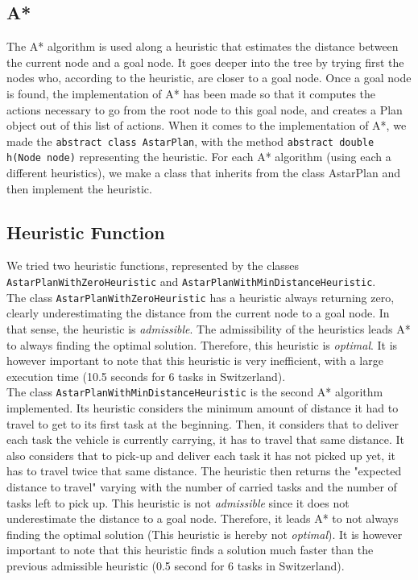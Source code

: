 \documentclass[11pt]{article}
\begin{document}
\subsection{A*}
The A* algorithm is used along a heuristic that estimates the distance between the current node and a goal node. It goes deeper into the tree by trying first the nodes who, according to the heuristic, are closer to a goal node. Once a goal node is found, the implementation of A* has been made so that it computes the actions necessary to go from the root node to this goal node, and creates a Plan object out of this list of actions. When it comes to the implementation of A*, we made the \texttt{abstract class AstarPlan}, with the method \texttt{abstract double h(Node node)} representing the heuristic. For each A* algorithm (using each a different heuristics), we make a class that inherits from\textsl{} the class AstarPlan and then implement the heuristic. 

\subsection{Heuristic Function}
We tried two heuristic functions, represented by the classes \texttt{AstarPlanWithZeroHeuristic} and \texttt{AstarPlanWithMinDistanceHeuristic}.\\

The class \texttt{AstarPlanWithZeroHeuristic} has a heuristic always returning zero, clearly underestimating the distance from the current node to a goal node. In that sense, the heuristic is \textit{admissible}. The admissibility of the heuristics leads A* to always finding the optimal solution. Therefore, this heuristic is \textit{optimal}. It is however important to note that this heuristic is very inefficient, with a large execution time (10.5 seconds for 6 tasks in Switzerland).\\

The class \texttt{AstarPlanWithMinDistanceHeuristic} is the second A* algorithm implemented. Its heuristic considers the minimum amount of distance it had to travel to get to its first task at the beginning. Then, it considers that to deliver each task the vehicle is currently carrying, it has to travel that same distance. It also considers that to pick-up and deliver each task it has not picked up yet, it has to travel twice that same distance. The heuristic then returns the "expected distance to travel" varying with the number of carried tasks and the number of tasks left to pick up. This heuristic is not \textit{admissible} since it does not underestimate the distance to a goal node. Therefore, it leads A* to not always finding the optimal solution (This heuristic is hereby not \textit{optimal}). It is however important to note that this heuristic finds a solution much faster than the previous admissible heuristic (0.5 second for 6 tasks in Switzerland).
\end{document}
